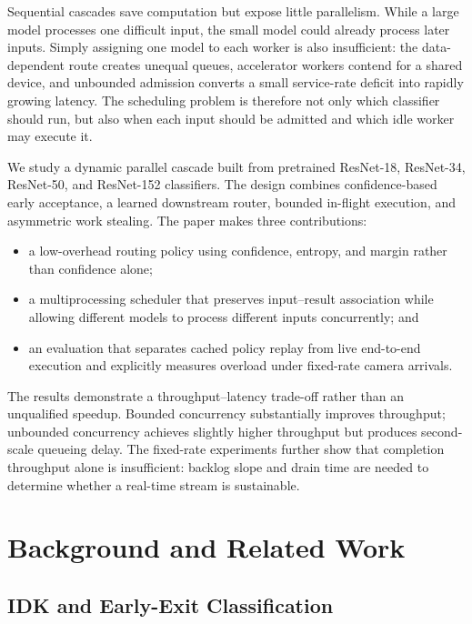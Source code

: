 Sequential cascades save computation but expose little parallelism.  While a
large model processes one difficult input, the small model could already
process later inputs.  Simply assigning one model to each worker is also
insufficient: the data-dependent route creates unequal queues, accelerator
workers contend for a shared device, and unbounded admission converts a small
service-rate deficit into rapidly growing latency.  The scheduling problem is
therefore not only which classifier should run, but also when each input should
be admitted and which idle worker may execute it.

We study a dynamic parallel cascade built from pretrained ResNet-18,
ResNet-34, ResNet-50, and ResNet-152 classifiers.  The design combines
confidence-based early acceptance, a learned downstream router, bounded
in-flight execution, and asymmetric work stealing.  The paper makes three
contributions:

\begin{itemize}
    \item a low-overhead routing policy using confidence, entropy, and margin
    rather than confidence alone;
    \item a multiprocessing scheduler that preserves input--result association
    while allowing different models to process different inputs concurrently;
    and
    \item an evaluation that separates cached policy replay from live
    end-to-end execution and explicitly measures overload under fixed-rate
    camera arrivals.
\end{itemize}

The results demonstrate a throughput--latency trade-off rather than an
unqualified speedup.  Bounded concurrency substantially improves throughput;
unbounded concurrency achieves slightly higher throughput but produces
second-scale queueing delay.  The fixed-rate experiments further show that
completion throughput alone is insufficient: backlog slope and drain time are
needed to determine whether a real-time stream is sustainable.

\section{Background and Related Work}
\label{sec:background}

\subsection{IDK and Early-Exit Classification}

